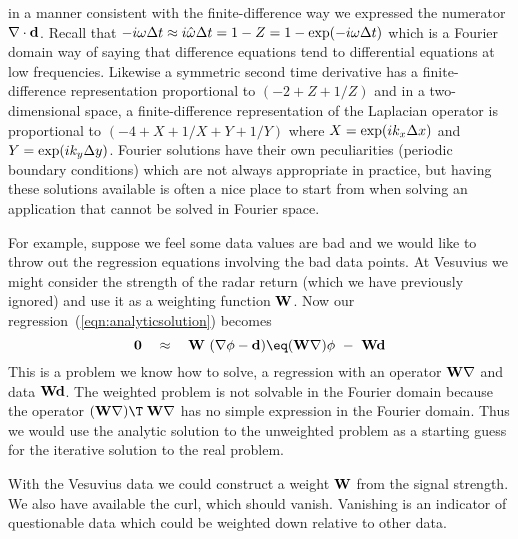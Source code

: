 in a manner consistent with the finite-difference way we expressed the numerator 
$\nabla \cdot {\bf d}$. Recall that $- i\omega \Delta t \approx i \hat{\omega} \Delta t = 1-Z = 1-{\rm exp}(-i \omega \Delta t)$ which is a Fourier 
domain way of saying that difference equations tend to differential equations at low 
frequencies. Likewise a symmetric second time derivative has a finite-difference 
representation proportional to $(-2+Z+1/Z)$ and in a two-dimensional space, a 
finite-difference representation of the Laplacian operator is proportional to $(-4+X+1/X+Y+1/Y)$ where $X = {\rm exp}(i k_x \Delta x )$ and $Y = {\rm exp}(i k_y \Delta y )$. 
Fourier solutions have their own peculiarities (periodic boundary conditions) 
which are not always appropriate in practice, but having these solutions available 
is often a nice place to start from when solving an application that cannot be solved 
in Fourier space.

\par
For example, suppose we feel some data values are bad and we
would like to throw out the regression equations involving the bad data points. At 
Vesuvius we might consider the strength of the radar return (which we have
previously ignored) and use it as a weighting function ${\bf W}$.
Now our regression~(\ref{eqn:analyticsolution}) becomes 
\begin{equation}
{\bf 0} \quad \approx\quad
{\bf W} \ (\nabla \phi -{\bf d})
\eq ({\bf W} \nabla) \phi \ -\  {\bf Wd}
\end{equation}
This is a problem we know how to solve,
a regression with an operator ${\bf W \nabla}$  and 
data ${\bf Wd}$. The weighted problem is not solvable in the Fourier domain because 
the operator $({\bf W} \nabla )\T\;{\bf W} \nabla$ has no simple expression in the Fourier domain. Thus we would use the analytic solution to the unweighted problem as a starting guess for 
the iterative solution to the real problem. 
\par
With the Vesuvius data we could construct a weight ${\bf W}$ from the signal strength.
We also have available the curl, which should vanish.
Vanishing is an indicator of questionable data
which could be weighted down relative to other data.


